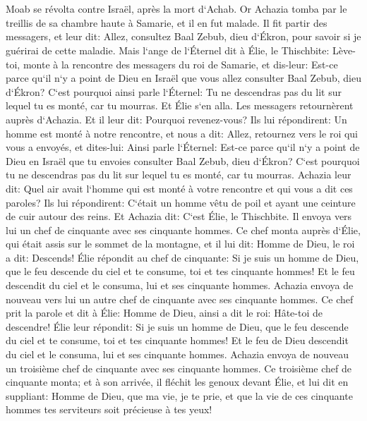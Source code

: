

\chapter{}

\verse Moab se révolta contre Israël, après la mort d`Achab. 
\verse Or Achazia tomba par le treillis de sa chambre haute à Samarie, et il en fut malade. Il fit partir des messagers, et leur dit: Allez, consultez Baal Zebub, dieu d`Ékron, pour savoir si je guérirai de cette maladie. 
\verse Mais l`ange de l`Éternel dit à Élie, le Thischbite: Lève-toi, monte à la rencontre des messagers du roi de Samarie, et dis-leur: Est-ce parce qu`il n`y a point de Dieu en Israël que vous allez consulter Baal Zebub, dieu d`Ékron? 
\verse C`est pourquoi ainsi parle l`Éternel: Tu ne descendras pas du lit sur lequel tu es monté, car tu mourras. Et Élie s`en alla. 
\verse Les messagers retournèrent auprès d`Achazia. Et il leur dit: Pourquoi revenez-vous? 
\verse Ils lui répondirent: Un homme est monté à notre rencontre, et nous a dit: Allez, retournez vers le roi qui vous a envoyés, et dites-lui: Ainsi parle l`Éternel: Est-ce parce qu`il n`y a point de Dieu en Israël que tu envoies consulter Baal Zebub, dieu d`Ékron? C`est pourquoi tu ne descendras pas du lit sur lequel tu es monté, car tu mourras. 
\verse Achazia leur dit: Quel air avait l`homme qui est monté à votre rencontre et qui vous a dit ces paroles? 
\verse Ils lui répondirent: C`était un homme vêtu de poil et ayant une ceinture de cuir autour des reins. Et Achazia dit: C`est Élie, le Thischbite. 
\verse Il envoya vers lui un chef de cinquante avec ses cinquante hommes. Ce chef monta auprès d`Élie, qui était assis sur le sommet de la montagne, et il lui dit: Homme de Dieu, le roi a dit: Descends! 
\verse Élie répondit au chef de cinquante: Si je suis un homme de Dieu, que le feu descende du ciel et te consume, toi et tes cinquante hommes! Et le feu descendit du ciel et le consuma, lui et ses cinquante hommes. 
\verse Achazia envoya de nouveau vers lui un autre chef de cinquante avec ses cinquante hommes. Ce chef prit la parole et dit à Élie: Homme de Dieu, ainsi a dit le roi: Hâte-toi de descendre! 
\verse Élie leur répondit: Si je suis un homme de Dieu, que le feu descende du ciel et te consume, toi et tes cinquante hommes! Et le feu de Dieu descendit du ciel et le consuma, lui et ses cinquante hommes. 
\verse Achazia envoya de nouveau un troisième chef de cinquante avec ses cinquante hommes. Ce troisième chef de cinquante monta; et à son arrivée, il fléchit les genoux devant Élie, et lui dit en suppliant: Homme de Dieu, que ma vie, je te prie, et que la vie de ces cinquante hommes tes serviteurs soit précieuse à tes yeux! 

